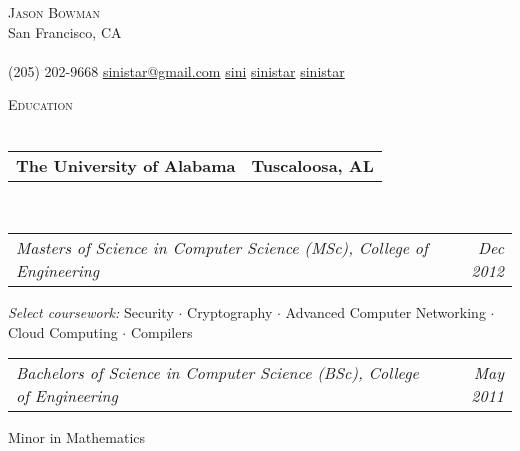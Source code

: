 \documentclass[10pt,letterpaper]{article}
\makeatletter
\newcommand{\area}[2]{\emph{#1:}   #2}
\newcommand{\lineunder}{\vspace*{-8pt} \\ \hspace*{-18pt} \hrulefill \\}
\newcommand{\header}[1]{{\hspace*{-15pt}\vspace*{6pt} \textsc{#1}} \vspace*{-6pt} \lineunder}
\newcommand{\contact}[3]{
\vspace*{-8pt}
\begin{center}
{\LARGE \scshape {#1}}\\
#2 \lineunder 
#3
\end{center}
\vspace*{-8pt}
}
\newcommand{\headerrow}[2]
{\begin{tabular*}{\linewidth}{l@{\extracolsep{\fill}}r}
	#1 &
	#2 \\
\end{tabular*}}
\newcommand{\education}[5]{
	\headerrow
		{\textbf{#1}}
		{\textbf{#2}}
	\\
	\headerrow
		{\emph{#3}}
		{\emph{#4}}
    #5
}
\makeatother
\begin{document}
\small
\smallskip
\vspace*{-30pt}

\contact{Jason Bowman}
{San Francisco, CA}
{\faPhone \hspace{0.1em} (205) 202-9668 \hspace{0.1em} \faEnvelope \hspace{0.1em}
  \href{mailto:sinistar@gmail.com}{sinistar@gmail.com} \hspace{0.1em} \faGithub \hspace{0.1em} \href{https://www.github.com/sini}{sini} \hspace{0.1em} \faTwitter
  \hspace{0.1em} \href{https://www.twitter.com/sinistar}{sinistar} \hspace{0.1em} \faLinkedin \hspace{0.1em}
  \href{https://linkedin.com/in/sinistar}{sinistar}}

\vspace*{3pt}

\header{Education}
\education{The University of Alabama}{Tuscaloosa, AL}{Masters of Science in
  Computer Science (MSc), College of Engineering}{Dec 2012}{
	\begin{itemize*}
		\item \area{Select
    coursework}{Security $\cdot$ Cryptography $\cdot$ Advanced Computer
    Networking $\cdot$ Cloud Computing $\cdot$ Compilers}
	\end{itemize*}
	\headerrow{\emph{Bachelors of Science in Computer Science (BSc), College of
      Engineering}}{\emph{May 2011}}
	\begin{itemize*}
  \item Minor in Mathematics
	\end{itemize*}
}


\vspace*{3pt}
\end{document}
